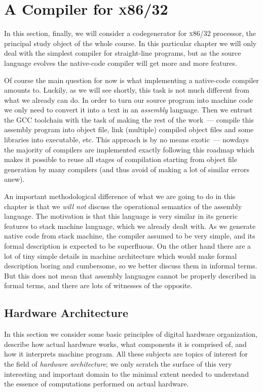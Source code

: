 \chapter{A Compiler for \textsc{x86/32}}

In this section, finally, we will consider a codegenerator for \textsc{x86/32} processor, the principal study
object of the whole course. In this particular chapter we will only deal with the simplest compiler for
straight-line programs, but as the source language evolves the native-code compiler will get more
and more features.

Of course the main question for now is what implementing a native-code compiler amounts to. Luckily, as we will
see shortly, this task is not much different from what we already can do. In order to turn our source program
into machine code we only need to convert it into a text in an \emph{assembly} language. Then we entrust
the \textsc{GCC} toolchain with the task of making the rest of the work~--- compile this assembly program into object file,
link (multiple) compiled object files and some libraries into executable, etc. This approach is by no means
exotic~--- nowdays the majority of compilers are implemented exactly following this roadmap which makes it
possible to reuse all stages of compilation starting from object file generation by many compilers (and thus
avoid of making a lot of similar errors anew).

An important methodological difference of what we are going to do in this chapter is that we \emph{will not}
discuss the operational semantics of the assembly language. The motivation is that this language is very similar
in its generic features to stack machine language, which we already dealt with. As we generate native code from
stack machine, the compiler assumed to be very simple, and its formal description is expected to be superfluous.
On the other hand there are a lot of tiny simple details in machine architecture which would make formal description
boring and cumbersome, so we better discuss them in informal terms. But this does not mean that assembly languages
cannot be properly described in formal terms, and there are lots of witnesses of the opposite.

\section{Hardware Architecture}

In this section we consider some basic principles of digital hardware organization, describe how actual hardware works,
what components it is comprised of, and how it interprets machine program. All these subjects are topics of interest
for the field of \emph{hardware architecture}; we only scratch the surface of this very interesting and important
domain to the minimal extent needed to understand the essence of computations performed on actual hardware.

